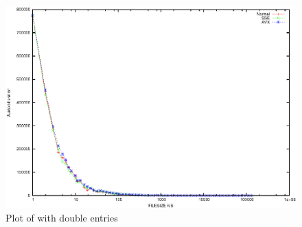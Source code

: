 \documentclass{article}
\begin{document}
\begin{center}
	\begin{figure}[h]
	\includegraphics[scale=0.75]{images/double.eps}
		\caption{Plot of with double entries}
	\end{figure}
\end{center}
\end{document}
